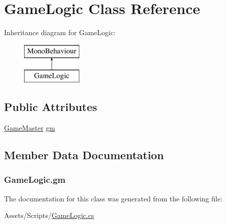 \hypertarget{class_game_logic}{}\section{Game\+Logic Class Reference}
\label{class_game_logic}
Inheritance diagram for Game\+Logic\+:\begin{figure}[H]
\begin{center}
\leavevmode
\includegraphics[height=2.000000cm]{class_game_logic}
\end{center}
\end{figure}
\subsection*{Public Attributes}
\begin{DoxyCompactItemize}
\item 
\hyperlink{class_game_master}{Game\+Master} \hyperlink{class_game_logic_ae7e3b55a6e38a6097a7fac91c4cc2702}{gm}
\end{DoxyCompactItemize}


\subsection{Member Data Documentation}
\hypertarget{class_game_logic_ae7e3b55a6e38a6097a7fac91c4cc2702}{}
\subsubsection[{gm}]{ Game\+Logic.\+gm}\label{class_game_logic_ae7e3b55a6e38a6097a7fac91c4cc2702}


The documentation for this class was generated from the following file\+:\begin{DoxyCompactItemize}
\item 
Assets/\+Scripts/\hyperlink{_game_logic_8cs}{Game\+Logic.\+cs}\end{DoxyCompactItemize}
